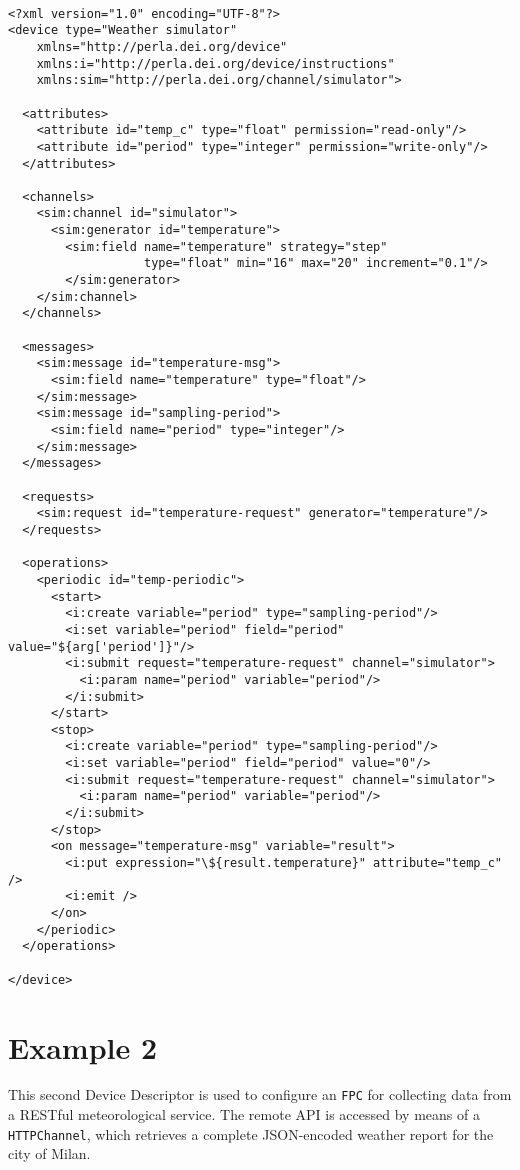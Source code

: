 ~\\
\lstset{language=XML}
\begin{lstlisting}
<?xml version="1.0" encoding="UTF-8"?>
<device type="Weather simulator"
    xmlns="http://perla.dei.org/device"
    xmlns:i="http://perla.dei.org/device/instructions"
    xmlns:sim="http://perla.dei.org/channel/simulator">

  <attributes>
    <attribute id="temp_c" type="float" permission="read-only"/>
    <attribute id="period" type="integer" permission="write-only"/>
  </attributes>

  <channels>
    <sim:channel id="simulator">
      <sim:generator id="temperature">
        <sim:field name="temperature" strategy="step"
                   type="float" min="16" max="20" increment="0.1"/>
        </sim:generator>
    </sim:channel>
  </channels>
  
  <messages>
    <sim:message id="temperature-msg">
      <sim:field name="temperature" type="float"/>
    </sim:message>
    <sim:message id="sampling-period">
      <sim:field name="period" type="integer"/>
    </sim:message>
  </messages>
  
  <requests>
    <sim:request id="temperature-request" generator="temperature"/>
  </requests>
  
  <operations>
    <periodic id="temp-periodic">
      <start>
        <i:create variable="period" type="sampling-period"/>
        <i:set variable="period" field="period" value="${arg['period']}"/>
        <i:submit request="temperature-request" channel="simulator">
          <i:param name="period" variable="period"/>
        </i:submit>
      </start>
      <stop>
        <i:create variable="period" type="sampling-period"/>
        <i:set variable="period" field="period" value="0"/>
        <i:submit request="temperature-request" channel="simulator">
          <i:param name="period" variable="period"/>
        </i:submit>
      </stop>
      <on message="temperature-msg" variable="result">
        <i:put expression="\${result.temperature}" attribute="temp_c" />
        <i:emit />
      </on>
    </periodic>
  </operations>

</device>
\end{lstlisting}

\section{Example 2}

This second Device Descriptor is used to configure an \texttt{FPC} for
collecting data from a RESTful meteorological service. The remote API is
accessed by means of a \texttt{HTTPChannel}, which retrieves a complete
JSON-encoded weather report for the city of Milan.

